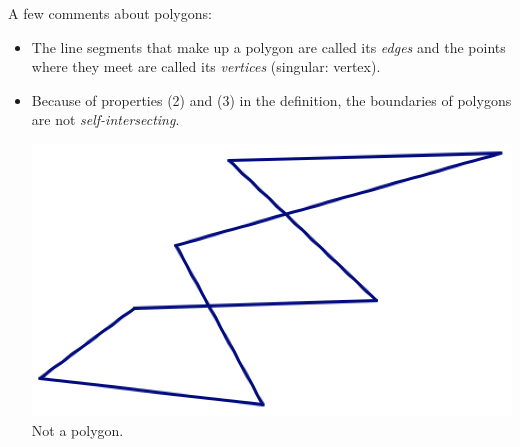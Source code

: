 \documentclass[12pt, reqno]{amsart}
\theoremstyle{remark}
\theoremstyle{definition}
\numberwithin{equation}{section}  %
\begin{document}
A few comments about polygons:
\begin{itemize}
\item
The line segments that make up a polygon are called its \emph{edges} and the points where they meet are called its \emph{vertices} (singular: vertex).\\

\item
Because of properties (2) and (3) in the definition, the boundaries of polygons are not \emph{self-intersecting}.\\

\begin{center}
\includegraphics[scale=0.35]{notpoly} \\
Not a polygon.\\
\end{center}


\end{itemize}
\end{document}
